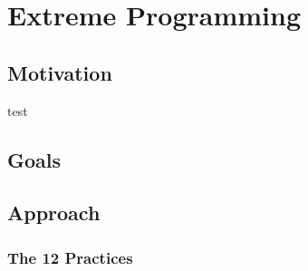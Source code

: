 \section{Extreme Programming}
\subsection{Motivation}
test
\subsection{Goals}
\subsection{Approach}
\subsubsection{The 12 Practices}
